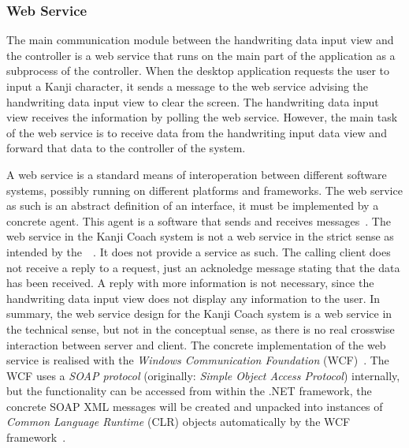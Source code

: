 \subsubsection{Web Service}
\label{sec:arch:webservice}


The main communication module between the handwriting data input view and the 
controller is a web service that runs on the main part of the application
as a subprocess of the controller. When the desktop application requests the 
user to input a Kanji character, it sends a message to the web service 
advising the handwriting data input view to clear the screen. 
The handwriting data input view receives the information by polling the 
web service. However, the main task of the web service is to receive data 
from the handwriting input data view and forward that data to the controller
of the system. 

A web service is a standard means of interoperation between different software
systems, possibly running on different platforms and frameworks. The web service
as such is an abstract definition of an interface, it must be implemented by a 
concrete agent. This agent is a software that sends and receives 
messages~.
The web service in the Kanji Coach system is not a web service in the strict 
sense as intended by the~~\citeyear{W3C2004}. It does not 
provide a service as such. The calling client does not receive a reply to a 
request, just an acknoledge message stating that the data has been received. 
A reply with more information is not necessary, since the handwriting data 
input view does not display any information to the user. 
In summary, the web service design for the Kanji Coach system is a web service
in the technical sense, but not in the conceptual sense, as there is no real
crosswise interaction between server and client.
The concrete implementation of the web service is realised with the
\emph{Windows Communication Foundation} (WCF)~.
The WCF uses a \emph{SOAP protocol} (originally: 
\emph{Simple Object Access Protocol}) internally, but the functionality can be 
accessed from within the .NET framework, the concrete SOAP XML messages will 
be created and unpacked into instances of \emph{Common Language Runtime} (CLR) 
objects automatically by the WCF 
framework~.


